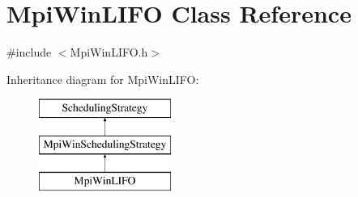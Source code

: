 \hypertarget{class_mpi_win_l_i_f_o}{}\section{Mpi\+Win\+L\+I\+F\+O Class Reference}
\label{class_mpi_win_l_i_f_o}


{\ttfamily \#include $<$Mpi\+Win\+L\+I\+F\+O.\+h$>$}

Inheritance diagram for Mpi\+Win\+L\+I\+F\+O\+:\begin{figure}[H]
\begin{center}
\leavevmode
\includegraphics[height=3.000000cm]{class_mpi_win_l_i_f_o}
\end{center}
\end{figure}

